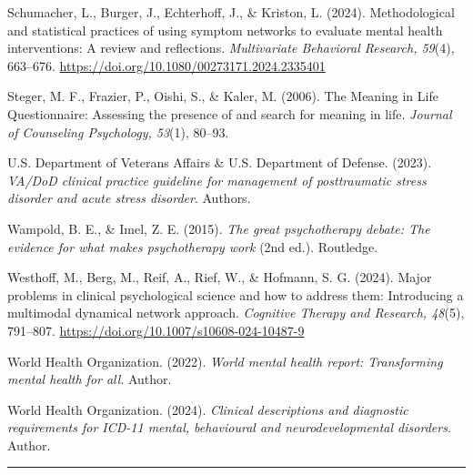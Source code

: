 \documentclass[
  11pt,
]{article}
\begin{document}
Schumacher, L., Burger, J., Echterhoff, J., \& Kriston, L. (2024).
Methodological and statistical practices of using symptom networks to
evaluate mental health interventions: A review and reflections.
\emph{Multivariate Behavioral Research, 59}(4), 663--676.
\url{https://doi.org/10.1080/00273171.2024.2335401}

Steger, M. F., Frazier, P., Oishi, S., \& Kaler, M. (2006). The Meaning
in Life Questionnaire: Assessing the presence of and search for meaning
in life. \emph{Journal of Counseling Psychology, 53}(1), 80--93.

U.S. Department of Veterans Affairs \& U.S. Department of Defense.
(2023). \emph{VA/DoD clinical practice guideline for management of
posttraumatic stress disorder and acute stress disorder}. Authors.

Wampold, B. E., \& Imel, Z. E. (2015). \emph{The great psychotherapy
debate: The evidence for what makes psychotherapy work} (2nd ed.).
Routledge.

Westhoff, M., Berg, M., Reif, A., Rief, W., \& Hofmann, S. G. (2024).
Major problems in clinical psychological science and how to address
them: Introducing a multimodal dynamical network approach.
\emph{Cognitive Therapy and Research, 48}(5), 791--807.
\url{https://doi.org/10.1007/s10608-024-10487-9}

World Health Organization. (2022). \emph{World mental health report:
Transforming mental health for all}. Author.

World Health Organization. (2024). \emph{Clinical descriptions and
diagnostic requirements for ICD-11 mental, behavioural and
neurodevelopmental disorders}. Author.

\begin{center}\rule{0.5\linewidth}{0.5pt}\end{center}
\end{document}
